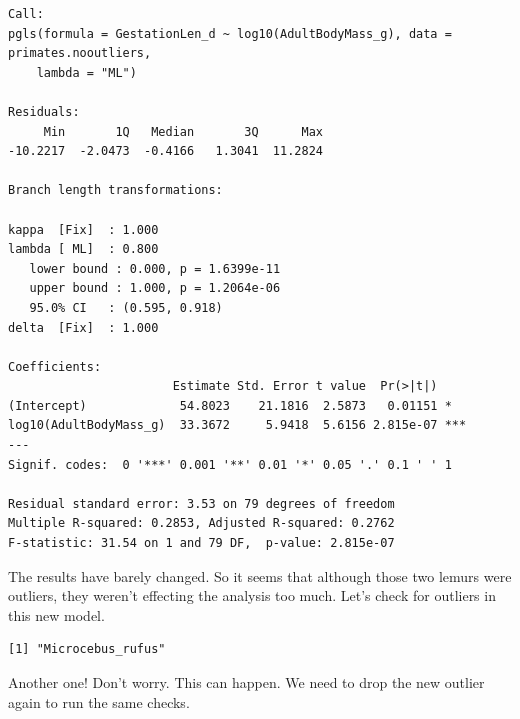 \documentclass[
]{book}
\newenvironment{Shaded}{\begin{snugshade}}{\end{snugshade}}
\newcommand{\DataTypeTok}[1]{\textcolor[rgb]{0.13,0.29,0.53}{#1}}
\newcommand{\DecValTok}[1]{\textcolor[rgb]{0.00,0.00,0.81}{#1}}
\newcommand{\KeywordTok}[1]{\textcolor[rgb]{0.13,0.29,0.53}{\textbf{#1}}}
\newcommand{\NormalTok}[1]{#1}
\newcommand{\OperatorTok}[1]{\textcolor[rgb]{0.81,0.36,0.00}{\textbf{#1}}}
\newcommand{\OtherTok}[1]{\textcolor[rgb]{0.56,0.35,0.01}{#1}}
\newcommand{\StringTok}[1]{\textcolor[rgb]{0.31,0.60,0.02}{#1}}
\begin{document}
\begin{verbatim}
Call:
pgls(formula = GestationLen_d ~ log10(AdultBodyMass_g), data = primates.nooutliers, 
    lambda = "ML")

Residuals:
     Min       1Q   Median       3Q      Max 
-10.2217  -2.0473  -0.4166   1.3041  11.2824 

Branch length transformations:

kappa  [Fix]  : 1.000
lambda [ ML]  : 0.800
   lower bound : 0.000, p = 1.6399e-11
   upper bound : 1.000, p = 1.2064e-06
   95.0% CI   : (0.595, 0.918)
delta  [Fix]  : 1.000

Coefficients:
                       Estimate Std. Error t value  Pr(>|t|)    
(Intercept)             54.8023    21.1816  2.5873   0.01151 *  
log10(AdultBodyMass_g)  33.3672     5.9418  5.6156 2.815e-07 ***
---
Signif. codes:  0 '***' 0.001 '**' 0.01 '*' 0.05 '.' 0.1 ' ' 1

Residual standard error: 3.53 on 79 degrees of freedom
Multiple R-squared: 0.2853, Adjusted R-squared: 0.2762 
F-statistic: 31.54 on 1 and 79 DF,  p-value: 2.815e-07 
\end{verbatim}

The results have barely changed. So it seems that although those two lemurs were outliers, they weren't effecting the analysis too much. Let's check for outliers in this new model.

\begin{Shaded}
\end{Shaded}

\begin{verbatim}
[1] "Microcebus_rufus"
\end{verbatim}

Another one! Don't worry. This can happen. We need to drop the new outlier again to run the same checks.
\end{document}
